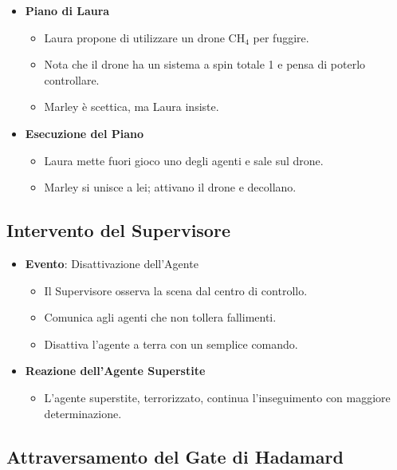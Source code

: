 \begin{itemize}
    \item \textbf{Piano di Laura}
    \begin{itemize}
        \item Laura propone di utilizzare un drone CH$_4$ per fuggire.
        \item Nota che il drone ha un sistema a spin totale 1 e pensa di poterlo controllare.
        \item Marley è scettica, ma Laura insiste.
    \end{itemize}
    \item \textbf{Esecuzione del Piano}
    \begin{itemize}
        \item Laura mette fuori gioco uno degli agenti e sale sul drone.
        \item Marley si unisce a lei; attivano il drone e decollano.
    \end{itemize}
\end{itemize}

\subsection*{Intervento del Supervisore}

\begin{itemize}
    \item \textbf{Evento}: Disattivazione dell'Agente
    \begin{itemize}
        \item Il Supervisore osserva la scena dal centro di controllo.
        \item Comunica agli agenti che non tollera fallimenti.
        \item Disattiva l'agente a terra con un semplice comando.
    \end{itemize}
    \item \textbf{Reazione dell'Agente Superstite}
    \begin{itemize}
        \item L'agente superstite, terrorizzato, continua l'inseguimento con maggiore determinazione.
    \end{itemize}
\end{itemize}

\subsection*{Attraversamento del Gate di Hadamard}

